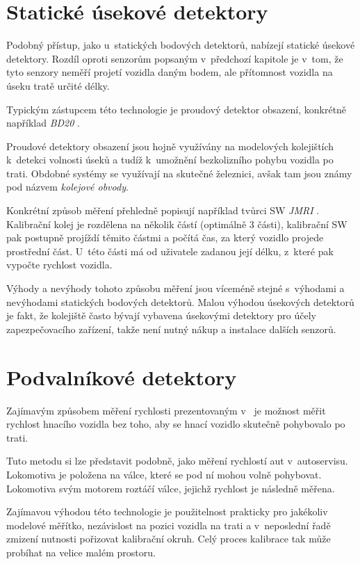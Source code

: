 \section{Statické úsekové detektory}

Podobný přístup, jako u~statických bodových detektorů, nabízejí statické
úsekové detektory. Rozdíl oproti senzorům popsaným v~předchozí kapitole je
v~tom, že tyto senzory neměří projetí vozidla daným bodem, ale přítomnost vozidla
na úseku tratě určité délky.

Typickým zástupcem této technologie je proudový detektor obsazení, konkrétně
například \textit{BD20} \cite{bd20}.

Proudové detektory obsazení jsou hojně využívány na modelových kolejištích k~detekci
volnosti úseků a tudíž k~umožnění bezkolizního pohybu vozidla po trati.
Obdobné systémy se využívají na skutečné železnici, avšak tam jsou známy pod
názvem \textit{kolejové obvody}.

Konkrétní způsob měření přehledně popisují například tvůrci SW \textit{JMRI}
\cite{jmri:speedometer}.
Kalibrační kolej je rozdělena na několik částí (optimálně 3 části), kalibrační
SW pak postupně projíždí těmito částmi a počítá čas, za který vozidlo projede
prostřední část. U~této části má od uživatele zadanou její délku, z~které pak
vypočte rychlost vozidla.

Výhody a nevýhody tohoto způsobu měření jsou víceméně stejné s~výhodami a
nevýhodami statických bodových detektorů. Malou výhodou úsekových detektorů je
fakt, že kolejiště často bývají vybavena úsekovými detektory pro účely
zapezpečovacího zařízení, takže není nutný nákup a instalace dalších senzorů.

\section{Podvalníkové detektory}

Zajímavým způsobem měření rychlosti prezentovaným v~\cite{bachrus}
je možnost měřit rychlost hnacího vozidla bez toho, aby se hnací vozidlo
skutečně pohybovalo po trati.

Tuto metodu si lze představit podobně, jako měření rychlostí aut v~autoservisu.
Lokomotiva je položena na válce, které se pod ní mohou volně pohybovat.
Lokomotiva svým motorem roztáčí válce, jejichž rychlost je následně měřena.

Zajímavou výhodou této technologie je použitelnost prakticky pro jakékoliv
modelové měřítko, nezávislost na pozici vozidla na trati a v~neposlední řadě
zmizení nutnosti pořizovat kalibrační okruh. Celý proces kalibrace tak může
probíhat na velice malém prostoru.

